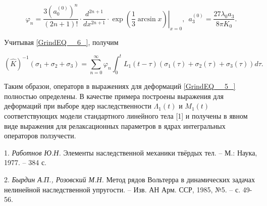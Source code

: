 \[\varphi _{n} =\frac{3(a_{0}^{(0)} )^{n} }{(2n+1)!} \cdot \frac{d^{2n+1} }{dx^{2n+1} } \cdot \exp \left.\left(\frac{1}{3} \arcsin x\right)\right|_{x=0} ,~~ a_{3}^{(0)}\! =\frac{27\lambda _{0} a_{3} }{8\pi K_{0} } .\]

Учитывая  \eqref{GrindEQ__6_},  получим

\[(\hat{K})^{-1} (\sigma _{1} +\sigma _{2} +\sigma _{3} )=\sum _{n=0}^{\infty }\varphi _{n}  \int _{0}^{t} \!\!\! L_{1}  (t-\tau )(\sigma _{1} (\tau )+\sigma _{2} (\tau )+\sigma _{3} (\tau ))d\tau .\]

Таким образои, операторв в выражениях для деформаций \eqref{GrindEQ__5_} полностью определены. В качестве примера построены выражения для деформаций при выборе ядер наследственности $\Lambda _{1} (t)$ и $M_{1} (t)$ соответствующих модели стандартного линейного тела  [1] и получены в явном виде выражения для релаксационных параметров в ядрах интегральных операторов ползучести.

\litlist

1.
{\it Работнов Ю.Н.} Элементы наследственной механики твёрдых тел. -- М.: Наука, 1977. -- 384 с.

2.
{\it Бырдин А.П., Розовский М.Н.} Метод рядов Вольтерра в динамических задачах  нелинейной наследственной упругости.  -- Изв. АН Арм. ССР, 1985, №5. -- с. 49-56.









